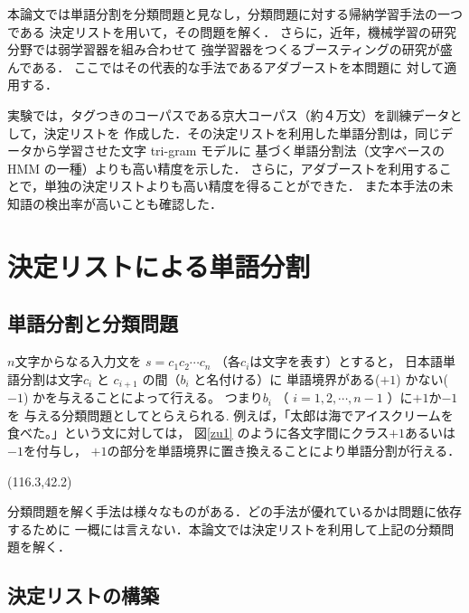本論文では単語分割を分類問題と見なし，分類問題に対する帰納学習手法の一つである
決定リスト\cite{Yarowsky1}を用いて，その問題を解く．
さらに，近年，機械学習の研究分野では弱学習器を組み合わせて
強学習器をつくるブースティングの研究が盛んである．
ここではその代表的な手法であるアダブースト\cite{adaboost}を本問題に
対して適用する．

実験では，タグつきのコーパスである京大コーパス（約４万文）を訓練データとして，決定リストを
作成した．その決定リストを利用した単語分割は，同じデータから学習させた文字 tri-gram モデルに
基づく単語分割法（文字ベースの HMM の一種）よりも高い精度を示した．
さらに，アダブーストを利用することで，単独の決定リストよりも高い精度を得ることができた．
また本手法の未知語の検出率が高いことも確認した．


\section{決定リストによる単語分割}


\subsection{単語分割と分類問題}

\( n \)文字からなる入力文を \( s = c_1 c_2 \cdots c_n \) （各\( c_i \)は文字を表す）とすると，
日本語単語分割は文字\( c_{i} \) と \( c_{i+1} \) 
の間（\( b_{i} \) と名付ける）に
単語境界がある(\(+1\)) かない(\(-1\)) かを与えることによって行える。
つまり\( b_{i} \) （ \( i = 1,2, \cdots, n-1 \) ）に\( +1 \)か\( -1 \)を
与える分類問題としてとらえられる.
例えば，「太郎は海でアイスクリームを食べた。」という文に対しては，
\mbox{図\ref{zu1}} のように各文字間にクラス\( +1 \)あるいは\( -1 \)を付与し，
\( +1 \)の部分を単語境界に置き換えることにより単語分割が行える．

\begin{figure*}[htbp]
\begin{center}
\atari(116.3,42.2)
\end{center}
\caption{クラスの付与による単語分割}
\label{zu1}
\end{figure*}

分類問題を解く手法は様々なものがある．どの手法が優れているかは問題に依存するために
一概には言えない．本論文では決定リストを利用して上記の分類問題を解く．

\subsection{決定リストの構築}

